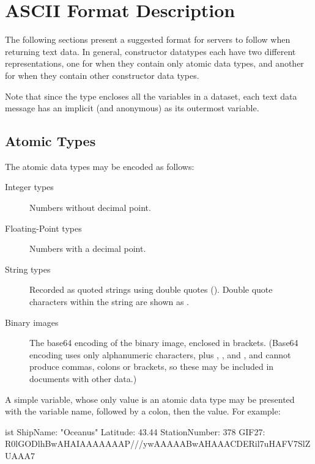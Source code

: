 \documentclass[justify]{dods-paper}
\begin{document}
\section{ASCII Format Description}

The following sections present a suggested format for servers to
follow when returning text data.  In general, constructor datatypes
each have two different representations, one for when they contain
only atomic data types, and another for when they contain other
constructor data types.

Note that since the \Dataset type encloses all the variables in a
dataset, each text data message has an implicit (and anonymous)
\Structure as its outermost variable.


\subsection{Atomic Types}
\label{sec-ascii-atomic}

The \DAP atomic data types may be encoded as follows:

\begin{description}
\item[Integer types] Numbers without decimal point.

\item[Floating-Point types] Numbers with a decimal point.
  
\item[String types] Recorded as quoted strings using double quotes
  (\qt).  Double quote characters within the string are shown as
  \texorhtml{$\backslash$}{\back}\qt.
  
\item[Binary images] The base64 encoding of the binary image, enclosed
  in brackets.  (Base64 encoding uses only alphanumeric characters,
  plus \lit{+}, \lit{/}, and \lit{=}, and cannot produce commas,
  colons or brackets, so these may be included in documents with other
  data.)

\end{description}

A simple variable, whose only value is an atomic data type may be
presented with the variable name, followed by a colon, then the
value.  For example:

\begin{vcode}{ist}
ShipName: "Oceanus"
Latitude: 43.44
StationNumber: 378
GIF27: {R0lGODlhBwAHAIAAAAAAAP///ywAAAAABwAHAAACDERil7uHAFV7SlZUAAA7}
\end{vcode}
\end{document}
